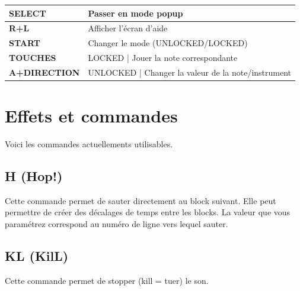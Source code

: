 \documentclass[12pt,a4paper]{article}
\begin{document}
    \tablelasttail{\hline}
    \begin{supertabular}{|l|p{11cm}|}
    \hline
        {\bf SELECT} & Passer en mode popup \\
        \hline
        {\bf R+L} & Afficher l'écran d'aide \\
        \hline
        {\bf START} & Changer le mode (UNLOCKED/LOCKED) \\
        \hline
        {\bf TOUCHES} & LOCKED | Jouer la note correspondante \\
        \hline
        {\bf A+DIRECTION} & UNLOCKED | Changer la valeur de la note/instrument \\
    \hline
    \end{supertabular}

    \newpage
    \section{Effets et commandes}
  

    Voici les commandes actuellements utilisables.

    \subsection{H (Hop!)}

    Cette commande permet de sauter directement au block suivant.
    Elle peut permettre de créer des décalages de temps entre les blocks.
    La valeur que vous paramétrez correspond au numéro de ligne vers lequel sauter.

    \subsection{KL (KilL)}

    Cette commande permet de stopper (kill = tuer) le son.

\end{document}
